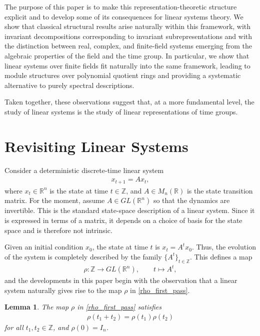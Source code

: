 \documentclass[letterpaper, 9pt, conference]{ieeeconf}
\newtheorem{lemma}[theorem]{Lemma}
\begin{document}
The purpose of this paper is to make this representation-theoretic structure
explicit and to develop some of its consequences for linear systems theory. We
show that classical structural results arise naturally within this framework, with
invariant decompositions corresponding to invariant subrepresentations and with
the distinction between real, complex, and finite-field systems emerging from the
algebraic properties of the field and the time group. In particular, we show that
linear systems over finite fields fit naturally into the same framework, leading
to module structures over polynomial quotient rings and providing a systematic
alternative to purely spectral descriptions.

Taken together, these observations suggest that, at a more fundamental level, the
study of linear systems is the study of linear representations of time groups.






\section{Revisiting Linear Systems}\label{sec_linear_system}

Consider a deterministic discrete-time linear system \cite{kailath_linear_book}
\begin{eqnarray}\label{linear_sys}
x_{t+1} = Ax_t,
\end{eqnarray}
where $x_t \in \mathbb{R}^n$ is the state at time $t \in \mathbb{Z}$, and
$A \in M_n(\mathbb{R})$ is the state transition matrix. For the moment, assume
$A \in GL(\mathbb{R}^n)$ so that the dynamics are invertible. This is the
standard state-space description of a linear system. Since it is expressed in
terms of a matrix, it depends on a choice of basis for the state space and is
therefore not intrinsic.

Given an initial condition $x_0$, the state at time $t$ is $x_t = A^t x_0$. Thus, the evolution of the system is completely described by the family
$\{A^t\}_{t \in \mathbb{Z}}$. This defines a map
\begin{eqnarray}\label{rho_first_pass}
\rho : \mathbb{Z} \to GL(\mathbb{R}^n), \qquad t \mapsto A^t,
\end{eqnarray}
and the developments in this paper begin with the observation that a linear
system naturally gives rise to the map $\rho$ in \eqref{rho_first_pass}.

\begin{lemma}\label{lemma_rep_def}
The map $\rho$ in \eqref{rho_first_pass} satisfies
\begin{eqnarray*}
\rho(t_1 + t_2) = \rho(t_1)\rho(t_2)
\end{eqnarray*}
for all $t_1,t_2 \in \mathbb{Z}$, and $\rho(0) = I_n$.
\end{lemma}
\end{document}
